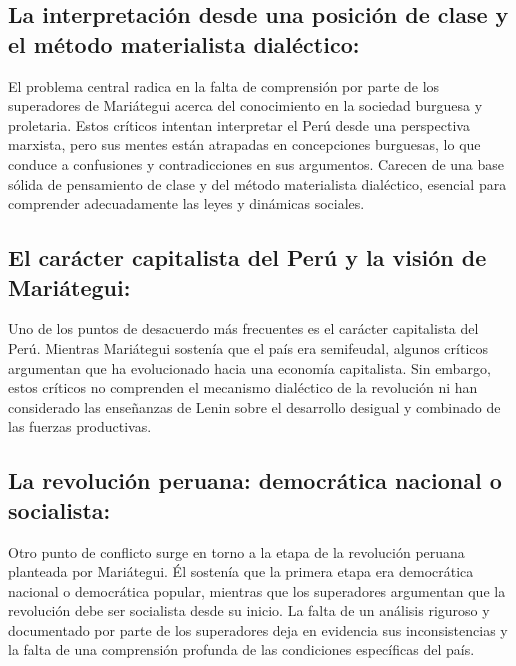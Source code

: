 \documentclass[
  jou,
  floatsintext,
  longtable,
  a4paper,
  nolmodern,
  notxfonts,
  notimes,
  12pt,
  colorlinks=true,linkcolor=blue,citecolor=blue,urlcolor=blue]{apa7}
\begin{document}
\subsection{La interpretación desde una posición de clase y el método
materialista
dialéctico:}\label{la-interpretaciuxf3n-desde-una-posiciuxf3n-de-clase-y-el-muxe9todo-materialista-dialuxe9ctico}

El problema central radica en la falta de comprensión por parte de los
superadores de Mariátegui acerca del conocimiento en la sociedad
burguesa y proletaria. Estos críticos intentan interpretar el Perú desde
una perspectiva marxista, pero sus mentes están atrapadas en
concepciones burguesas, lo que conduce a confusiones y contradicciones
en sus argumentos. Carecen de una base sólida de pensamiento de clase y
del método materialista dialéctico, esencial para comprender
adecuadamente las leyes y dinámicas sociales.

\subsection{El carácter capitalista del Perú y la visión de
Mariátegui:}\label{el-caruxe1cter-capitalista-del-peruxfa-y-la-visiuxf3n-de-mariuxe1tegui}

Uno de los puntos de desacuerdo más frecuentes es el carácter
capitalista del Perú. Mientras Mariátegui sostenía que el país era
semifeudal, algunos críticos argumentan que ha evolucionado hacia una
economía capitalista. Sin embargo, estos críticos no comprenden el
mecanismo dialéctico de la revolución ni han considerado las enseñanzas
de Lenin sobre el desarrollo desigual y combinado de las fuerzas
productivas.

\subsection{La revolución peruana: democrática nacional o
socialista:}\label{la-revoluciuxf3n-peruana-democruxe1tica-nacional-o-socialista}

Otro punto de conflicto surge en torno a la etapa de la revolución
peruana planteada por Mariátegui. Él sostenía que la primera etapa era
democrática nacional o democrática popular, mientras que los superadores
argumentan que la revolución debe ser socialista desde su inicio. La
falta de un análisis riguroso y documentado por parte de los superadores
deja en evidencia sus inconsistencias y la falta de una comprensión
profunda de las condiciones específicas del país.
\end{document}
